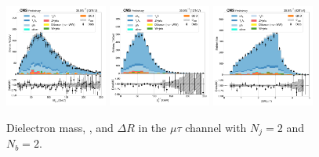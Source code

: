 \begin{figure}[htb!]
    \centering
    \includegraphics[width=0.3\textwidth]{chapters/Appendix/sectionPlots/figures/data_mc_overlays/mutau_2016_cat_eq2_eq2_signal_linear_lepton_dilepton1_mass}
    \includegraphics[width=0.3\textwidth]{chapters/Appendix/sectionPlots/figures/data_mc_overlays/mutau_2016_cat_eq2_eq2_signal_linear_lepton_dilepton1_pt}
    \includegraphics[width=0.3\textwidth]{chapters/Appendix/sectionPlots/figures/data_mc_overlays/mutau_2016_cat_eq2_eq2_signal_linear_lepton_dilepton1_delta_r}
    \caption{Dielectron mass, \pt, and $\Delta R$ in the $\mu\tau$ channel
    with $N_{j} = 2$ and $N_{b} = 2$.}
    \label{fig:mutau_6_dilepton}
\end{figure}

